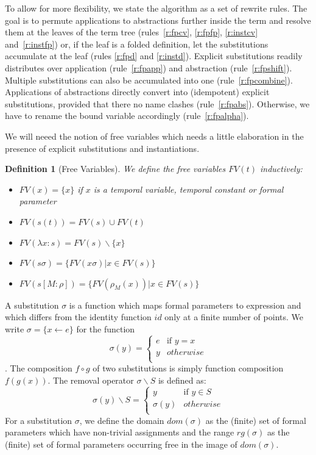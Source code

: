 \documentclass[a4paper]{article}
\newcommand{\set}[1]{\{#1\}}
\newcommand{\fpsubstin}[1]{\{#1\}}
\newcommand{\fpscat}[0]{\circ}
\newcommand{\substin}[2]{[#1:#2]}
\newcommand{\fpwith}{\leftarrow}
\newcommand{\fpwithout}[0]{\backslash}
\newcommand{\fpwithoutset}[1]{\backslash\{#1\}}
\newtheorem{definition}{Definition}
\begin{document}
To allow for more flexibility, we state the algorithm as a set of rewrite
rules. The goal is to permute applications to abstractions further inside the
term and resolve them at the leaves of the term tree (rules~\ref{r:fpcv},
\ref{r:fpfp}, \ref{r:instcv} and~\ref{r:instfp}) or,
if the leaf is a folded definition, let the substitutions accumulate at the
leaf (rules \ref{r:fpd} and \ref{r:instd}). Explicit substitutions readily
distributes over application (rule~\ref{r:fpapp}) and abstraction
(rule~\ref{r:fpshift}). Multiple substitutions can also be accumulated
into one (rule~\ref{r:fpcombine}).
Applications of abstractions directly convert into (idempotent) explicit
substitutions, provided that there no name clashes (rule~\ref{r:fpabs}).
Otherwise, we have to rename the bound variable accordingly
(rule~\ref{r:fpalpha}).


We will neeed the notion of free variables which needs a little elaboration
 in the presence of explicit substitutions and instantiations.

 \begin{definition}[Free Variables]
   We define the free variables $FV(t)$ inductively:
   \begin{itemize}
   \item $FV(x) = \set{x}$ if $x$ is a temporal variable, temporal constant or
     formal parameter
   \item $FV(s(t)) = FV(s) \cup FV(t)$
   \item $FV(\lambda x : s) = FV(s) \fpwithoutset{x}$
   \item $FV(s\sigma) = \set{FV(x\sigma) | x \in FV(s) }$
   \item $FV(s\substin{M}{\rho}) = \set{FV(\rho_M(x) ) | x \in FV(s)} $
   \end{itemize}
 \end{definition}

A substitution $\sigma$ is a function which maps formal parameters
to expression and which differs from the identity function $id$ only at a
finite number of points. We write $\sigma=\fpsubstin{x \fpwith e}$ for the
function
\[\sigma(y)=\left\{
    \begin{array}{ll}
      e& \mbox{if }y = x\\
      y & otherwise\\
    \end{array}\right.
\]. The composition $f \fpscat g$ of two substitutions is simply function
composition $f(g(x))$. The removal operator $\sigma\fpwithout S$ is defined
as:
\[\sigma(y)\fpwithout S = \left\{
    \begin{array}{ll}
      y &\mbox{if }y \in S\\
      \sigma(y) & otherwise\\
    \end{array}\right.
\]
For a substitution $\sigma$, we define the domain $dom(\sigma)$ as the (finite)
set of formal parameters which have non-trivial assignments and the range
$rg(\sigma)$ as the (finite) set of formal parameters occurring free in the
image of $dom(\sigma)$.
\end{document}
